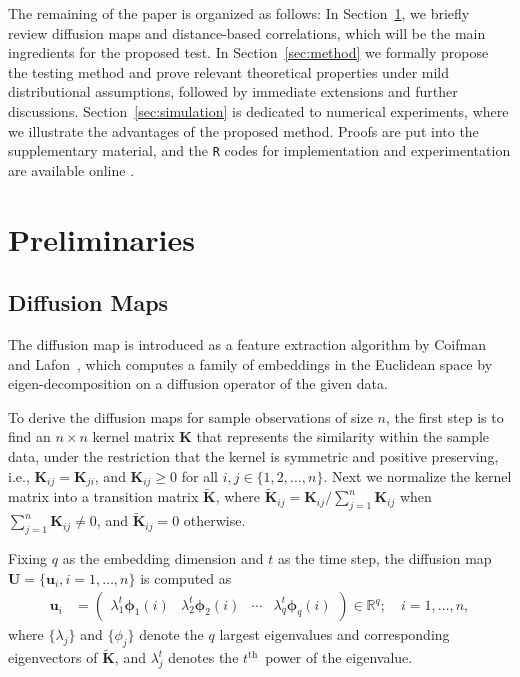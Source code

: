 \documentclass[11pt]{article}
\theoremstyle{definition}
\begin{document}
The remaining of the paper is organized as follows: In Section~\ref{sec:pre}, we briefly review diffusion maps and distance-based correlations, which will be the main ingredients for the proposed test. In Section~\ref{sec:method} we formally propose the testing method and prove relevant theoretical properties under mild distributional assumptions, followed by immediate extensions and further discussions. Section~\ref{sec:simulation} is dedicated to numerical experiments, where we illustrate the advantages of the proposed method. Proofs are put into the supplementary material, and the \texttt{R} codes for implementation and experimentation are available online \footnotemark{}.

\section{Preliminaries}
\label{sec:pre}
\subsection{Diffusion Maps}
\label{ssec:method2}

The diffusion map is introduced as a feature extraction algorithm by Coifman and Lafon~\cite{coifman2005geometric,coifman2006diffusion,lafon2006diffusion}, which computes a family of embeddings in the Euclidean space by eigen-decomposition on a diffusion operator of the given data. 

To derive the diffusion maps for sample observations of size $n$, the first step is to find an $n \times n$ kernel matrix $\mathbf{K}$ that represents the similarity within the sample data, under the restriction that the kernel is symmetric and positive preserving, i.e., $\mathbf{K}_{ij}=\mathbf{K}_{ji}$, and $\mathbf{K}_{ij} \geq 0$ for all $i,j \in \{1, 2, \ldots, n\}$. Next we normalize the kernel matrix into a transition matrix $\mathbf{\widetilde{K}}$, where $\mathbf{\widetilde{K}}_{ij} = \mathbf{K}_{ij} / \sum\limits_{j=1}^{n} \mathbf{K}_{ij}$ when $\sum\limits_{j=1}^{n} \mathbf{K}_{ij} \neq 0$, and $\mathbf{\widetilde{K}}_{ij}=0$ otherwise.

Fixing $q$ as the embedding dimension and $t$ as the time step, the diffusion map $\mathbf{U}=\{\mathbf{u}_i, i=1,\ldots,n\}$ is computed as 
\begin{align}
\label{eq:U}
\mathbf{u}_i  &= \begin{pmatrix} \lambda^{t}_{1} \mathbf{\phi}_{1}(i) & \lambda^{t}_{2} \mathbf{\phi}_{2} (i)  & \cdots & \lambda^{t}_{q} \mathbf{\phi}_{q}(i) \end{pmatrix} \in \mathbb{R}^{q}; \quad i = 1, \ldots, n,
\end{align}
where $\{ \lambda_{j} \}$ and $\{ \phi_{j}  \}$ denote the $q$ largest eigenvalues and corresponding eigenvectors of $\mathbf{\widetilde{K}}$, and $\lambda^{t}_{j}$ denotes the $t^{\mbox{th}}$~power of the eigenvalue.
\end{document}

